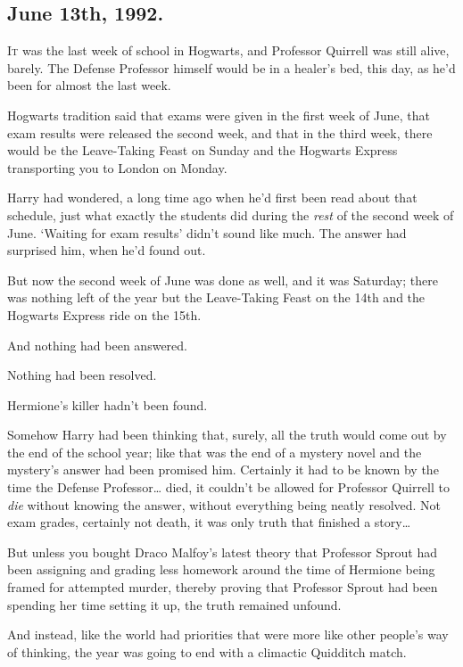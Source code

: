 
\subsection{June 13th, 1992.}

\lettrine{I}{t} was the last week of school in Hogwarts, and Professor Quirrell was still 
alive, barely. The Defense Professor himself would be in a healer's bed, this 
day, as he'd been for almost the last week.

Hogwarts tradition said that exams were given in the first week of June, that 
exam results were released the second week, and that in the third week, there 
would be the Leave-Taking Feast on Sunday and the Hogwarts Express transporting 
you to London on Monday.

Harry had wondered, a long time ago when he'd first been read about that 
schedule, just what exactly the students did during the \emph{rest} of the 
second week of June. `Waiting for exam results' didn't sound like much. The 
answer had surprised him, when he'd found out.

But now the second week of June was done as well, and it was Saturday; there 
was nothing left of the year but the Leave-Taking Feast on the 14th and the 
Hogwarts Express ride on the 15th.

And nothing had been answered.

Nothing had been resolved.

Hermione's killer hadn't been found.

Somehow Harry had been thinking that, surely, all the truth would come out by 
the end of the school year; like that was the end of a mystery novel and the 
mystery's answer had been promised him. Certainly it had to be known by the 
time the Defense Professor{\ldots} died, it couldn't be allowed for Professor 
Quirrell to \emph{die} without knowing the answer, without everything being 
neatly resolved. Not exam grades, certainly not death, it was only truth that 
finished a story{\ldots}

But unless you bought Draco Malfoy's latest theory that Professor Sprout had 
been assigning and grading less homework around the time of Hermione being 
framed for attempted murder, thereby proving that Professor Sprout had been 
spending her time setting it up, the truth remained unfound.

And instead, like the world had priorities that were more like other people's 
way of thinking, the year was going to end with a climactic Quidditch match.

